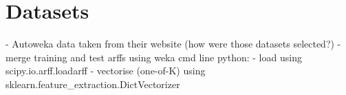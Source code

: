 \documentclass[11pt]{report}
\begin{document}
\section{Datasets}
- Autoweka data taken from their website (how were those datasets selected?)
- merge training and test arffs using weka cmd line
python:
- load using scipy.io.arff.loadarff
- vectorise (one-of-K) using sklearn.feature_extraction.DictVectorizer
\end{document}
